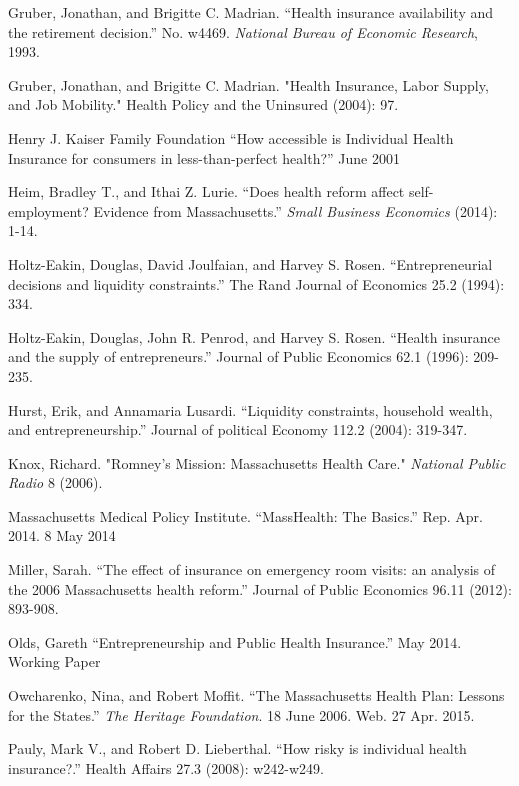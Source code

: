 \documentclass[12pt]{article}
\begin{document}
\begin{thebibliography}{99}
Gruber, Jonathan, and Brigitte C. Madrian. ``Health insurance availability and the retirement decision.'' No. w4469. \emph{National Bureau of Economic Research}, 1993.

Gruber, Jonathan, and Brigitte C. Madrian. "Health Insurance, Labor Supply, and Job Mobility." Health Policy and the Uninsured (2004): 97.

Henry J. Kaiser Family Foundation ``How accessible is Individual Health Insurance for consumers in less-than-perfect health?'' June 2001

Heim, Bradley T., and Ithai Z. Lurie. ``Does health reform affect self-employment? Evidence from Massachusetts.'' \emph{Small Business Economics} (2014): 1-14.

Holtz-Eakin, Douglas, David Joulfaian, and Harvey S. Rosen. ``Entrepreneurial decisions and liquidity constraints.'' The Rand Journal of Economics 25.2 (1994): 334.

Holtz-Eakin, Douglas, John R. Penrod, and Harvey S. Rosen. ``Health insurance and the supply of entrepreneurs.'' Journal of Public Economics 62.1 (1996): 209-235.

Hurst, Erik, and Annamaria Lusardi. ``Liquidity constraints, household wealth, and entrepreneurship.'' Journal of political Economy 112.2 (2004): 319-347.

Knox, Richard. "Romney’s Mission: Massachusetts Health Care." \emph{National Public Radio} 8 (2006).

Massachusetts Medical Policy Institute. ``MassHealth: The Basics.'' Rep. Apr. 2014. 8 May 2014 

Miller, Sarah. ``The effect of insurance on emergency room visits: an analysis of the 2006 Massachusetts health reform.'' Journal of Public Economics 96.11 (2012): 893-908.

Olds, Gareth ``Entrepreneurship and Public Health Insurance.'' May 2014. Working Paper

Owcharenko, Nina, and Robert Moffit. ``The Massachusetts Health Plan: Lessons for the States.'' \emph{The Heritage Foundation}. 18 June 2006. Web. 27 Apr. 2015.

Pauly, Mark V., and Robert D. Lieberthal. ``How risky is individual health insurance?.'' Health Affairs 27.3 (2008): w242-w249.


\end{thebibliography}
\end{document}
